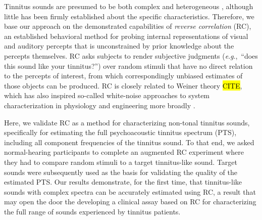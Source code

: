 \documentclass[journal]{IEEEtran}
\newcommand{\eg}{\textit{e}.\textit{g}.,\ }
\begin{document}
Tinnitus sounds are presumed to be both complex and heterogeneous \cite{vajsakovicPrinciplesMethodsPsychoacoustic2021, henryTinnitusEpidemiologicPerspective2020},
although little has been firmly established about the specific characteristics.
Therefore, we base our approach on the demonstrated capabilities of \textit{reverse correlation} (RC),
an established behavioral method \cite{ahumadaStimulusFeaturesSignal1971,gosselinSuperstitiousPerceptionsReveal2003,brimijoinInternalRepresentationVowel2013} for probing internal representations of visual and auditory percepts that is unconstrained by prior knowledge about the percepts themselves.
RC asks subjects to render subjective judgments (\eg “does this sound like your tinnitus?”)
over random stimuli that have no direct relation to the percepts of interest,
from which correspondingly unbiased estimates of those objects can be produced.
RC is closely related to Weiner theory \hl{CITE},
which has also inspired so-called white-noise approaches to system characterization in physiology
\cite{ringachReverseCorrelationNeurophysiology2004,marmarelisWhiteNoiseMethodSystem1978,neriReceptivePerceptiveFields2006} and engineering more broadly \cite{ljungMeasureLackFit1978}.

Here, we validate RC as a method for characterizing non-tonal tinnitus sounds,
specifically for estimating the full psychoacoustic tinnitus spectrum (PTS),
including all component frequencies of the tinnitus sound.
To that end, we asked normal-hearing participants to complete an augmented RC experiment where they had to compare random stimuli to a target tinnitus-like sound.
Target sounds were subsequently used as the basis for validating the quality of the estimated PTS.
Our results demonstrate, for the first time, that tinnitus-like sounds with complex spectra can be accurately estimated using RC,
a result that may open the door the developing a clinical assay based on RC for characterizing the full range of sounds experienced by tinnitus patients.

\end{document}
